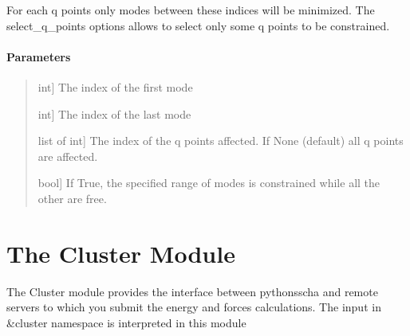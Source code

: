 \documentclass[a4paper,11pt,english]{sphinxmanual}
\begin{document}
\begin{fulllineitems}
\begin{fulllineitems}
\sphinxAtStartPar
For each q points only modes between these indices will be minimized.
The select\_q\_points options allows to select only some q points to be constrained.


\paragraph{Parameters}
\label{\detokenize{apireference:id47}}\begin{quote}
\begin{description}
\sphinxlineitem{index\_mode\_start}{[}int{]}
\sphinxAtStartPar
The index of the first mode

\sphinxlineitem{index\_mode\_end}{[}int{]}
\sphinxAtStartPar
The index of the last mode

\sphinxlineitem{select\_q\_points}{[}list of int{]}
\sphinxAtStartPar
The index of the q points affected. 
If None (default) all q points are affected.

\sphinxlineitem{constrain}{[}bool{]}
\sphinxAtStartPar
If True, the specified range of modes is constrained while all the other are free.

\end{description}
\end{quote}

\end{fulllineitems}


\end{fulllineitems}



\section{The Cluster Module}
\label{\detokenize{apireference:the-cluster-module}}
\sphinxAtStartPar
The Cluster module provides the interface between python\sphinxhyphen{}sscha and remote servers to which you submit the energy and forces calculations.
The input in \&cluster namespace is interpreted in this module
\end{document}
